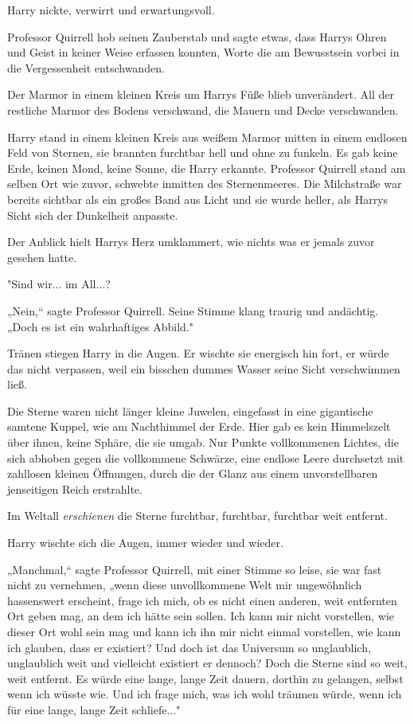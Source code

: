 {Harry nickte, verwirrt und erwartungsvoll.

Professor Quirrell hob seinen Zauberstab und sagte etwas, dass Harrys Ohren und Geist in keiner Weise erfassen konnten, Worte die am Bewusstsein vorbei in die Vergessenheit entschwanden.

Der Marmor in einem kleinen Kreis um Harrys Füße blieb unverändert. All der restliche Marmor des Bodens verschwand, die Mauern und Decke verschwanden.

Harry stand in einem kleinen Kreis aus weißem Marmor mitten in einem endlosen Feld von Sternen, sie brannten furchtbar hell und ohne zu funkeln. Es gab keine Erde, keinen Mond, keine Sonne, die Harry erkannte. Professor Quirrell stand am selben Ort wie zuvor, schwebte inmitten des Sternenmeeres. Die Milchstraße war bereits sichtbar als ein großes Band aus Licht und sie wurde heller, als Harrys Sicht sich der Dunkelheit anpasste.

Der Anblick hielt Harrys Herz umklammert, wie nichts was er jemals zuvor gesehen hatte.

"Sind wir... im All...?

„Nein,“ sagte Professor Quirrell. Seine Stimme klang traurig und andächtig. „Doch es ist ein wahrhaftiges Abbild."

Tränen stiegen Harry in die Augen. Er wischte sie energisch hin fort, er würde das nicht verpassen, weil ein bisschen dummes Wasser seine Sicht verschwimmen ließ.

Die Sterne waren nicht länger kleine Juwelen, eingefasst in eine gigantische samtene Kuppel, wie am Nachthimmel der Erde. Hier gab es kein Himmelszelt über ihnen, keine Sphäre, die sie umgab. Nur Punkte vollkommenen Lichtes, die sich abhoben gegen die vollkommene Schwärze, eine endlose Leere durchsetzt mit zahllosen kleinen Öffnungen, durch die der Glanz aus einem unvorstellbaren jenseitigen Reich erstrahlte.

Im Weltall \emph{erschienen} die Sterne furchtbar, furchtbar, furchtbar weit entfernt.

Harry wischte sich die Augen, immer wieder und wieder.

„Manchmal,“ sagte Professor Quirrell, mit einer Stimme so leise, sie war fast nicht zu vernehmen, „wenn diese unvollkommene Welt mir ungewöhnlich hassenswert erscheint, frage ich mich, ob es nicht einen anderen, weit entfernten Ort geben mag, an dem ich hätte sein sollen. Ich kann mir nicht vorstellen, wie dieser Ort wohl sein mag und kann ich ihn mir nicht einmal vorstellen, wie kann ich glauben, dass er existiert? Und doch ist das Universum so unglaublich, unglaublich weit und vielleicht existiert er dennoch? Doch die Sterne sind so weit, weit entfernt. Es würde eine lange, lange Zeit dauern, dorthin zu gelangen, selbst wenn ich wüsste wie. Und ich frage mich, was ich wohl träumen würde, wenn ich für eine lange, lange Zeit schliefe..."

}
